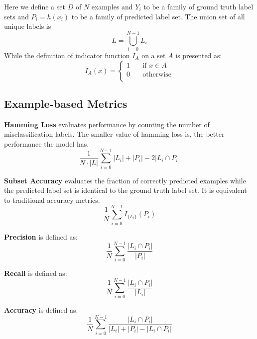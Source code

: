 Here we define a set $D$ of $N$ examples and $Y_{i}$ to be a family of ground truth label sets and $P_{i} = h(x_{i})$ to be a family of predicted label set. The union set of all unique labels is
\begin{equation}\label{eq:UniLabel}
L = \bigcup_{i=0}^{N-1} L_{i}
\end{equation}
While the definition of indicator function $I_{A}$ on a set $A$ is presented as:
\begin{equation}\label{eq:IndicatorFunc}
I_{A}(x) =
  \begin{cases}
    1       & \quad \text{if } x \in A\\
    0  & \quad \text{otherwise}\\
  \end{cases}
\end{equation}

\subsection{Example-based Metrics}

\textbf{Hamming Loss} evaluates performance by counting the number of misclassification labels. The smaller value of hamming loss is, the better performance the model has.
\begin{equation}\label{eq:HammingLoss}
\frac{1}{N \cdot \left|L\right|} \sum_{i=0}^{N - 1} \left|L_i\right| + \left|P_i\right| - 2\left|L_i
          \cap P_i\right|
\end{equation}

\textbf{Subset Accuracy} evaluates the fraction of correctly predicted examples while the predicted label set is identical to the ground truth label set. It is equivalent to traditional accuracy metrics.
\begin{equation}\label{eq:SubsetAcu}
\frac{1}{N} \sum_{i=0}^{N-1} I_{\{L_i\}}(P_i)
\end{equation}

\textbf{Precision} is defined as:
\begin{equation}\label{eq:Precision}
\frac{1}{N} \sum_{i=0}^{N-1} \frac{\left|L_i \cap P_i\right|}{\left|P_i\right|}
\end{equation}

\textbf{Recall} is defined as:
\begin{equation}\label{eq:Recall}
\frac{1}{N} \sum_{i=0}^{N-1} \frac{\left|L_i \cap P_i\right|}{\left|L_i\right|}
\end{equation}

\textbf{Accuracy} is defined as:
\begin{equation}\label{eq:Accuracy}
\frac{1}{N} \sum_{i=0}^{N - 1} \frac{\left|L_i \cap P_i \right|}
        {\left|L_i\right| + \left|P_i\right| - \left|L_i \cap P_i \right|}
\end{equation}

